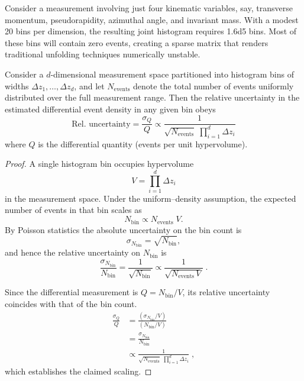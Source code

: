             Consider a measurement involving just four kinematic variables, say, transverse momentum, pseudorapidity, azimuthal angle, and invariant mass.
            With a modest 20 bins per dimension, the resulting joint histogram requires \num{1.6d5} bins.
            Most of these bins will contain zero events, creating a sparse matrix that renders traditional unfolding techniques numerically unstable.
            
            \begin{theorem}
                \label{prop:relative-uncertainty}
                Consider a \(d\)-dimensional measurement space partitioned into histogram bins of widths \(\Delta z_1,\dots,\Delta z_d\), and let \(N_{\text{events}}\) denote the total number of events uniformly distributed over the full measurement range.
                Then the relative uncertainty in the estimated differential event density in any given bin obeys
                \begin{equation}
                    \text{Rel.\ uncertainty} = \frac{\sigma_{Q}}{Q} \propto \frac{1}{\sqrt{N_{\text{events}}}\;\prod_{i=1}^d\Delta z_i}
                \end{equation}
                where \(Q\) is the differential quantity (events per unit hypervolume).
            \end{theorem}
                
            \begin{proof}
                A single histogram bin occupies hypervolume
                \[
                    V = \prod_{i=1}^d \Delta z_i
                \]
                in the measurement space.
                Under the uniform--density assumption, the expected number of events in that bin scales as
                \[
                    N_{\text{bin}} \propto N_{\text{events}}\;V.
                \]
                By Poisson statistics the absolute uncertainty on the bin count is
                \[
                    \sigma_{N_{\text{bin}}} = \sqrt{N_{\text{bin}}},
                \]
                and hence the relative uncertainty on \(N_{\text{bin}}\) is
                \[
                    \frac{\sigma_{N_{\text{bin}}}}{N_{\text{bin}}} = \frac{1}{\sqrt{N_{\text{bin}}}} \propto \frac{1}{\sqrt{N_{\text{events}}\,V}}\;.
                \]
                
                Since the differential measurement is \(Q = N_{\text{bin}}/V\), its relative uncertainty coincides with that of the bin count.
                \begin{align}
                    \frac{\sigma_Q}{Q} &= \frac{(\sigma_{N_{\text{bin}}}/V)}{(N_{\text{bin}}/V)} \\
                    &= \frac{\sigma_{N_{\text{bin}}}}{N_{\text{bin}}} \\
                    &\propto \frac{1}{\sqrt{N_{\text{events}}}\;\prod_{i=1}^d\Delta z_i}\;,
                \end{align}
                which establishes the claimed scaling.
            \end{proof}
            

